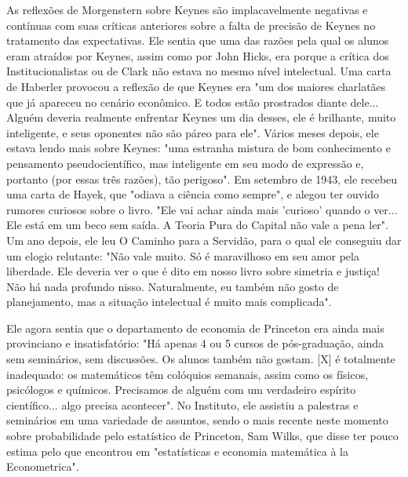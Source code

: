 \documentclass[12pt]{article}
\begin{document}
As reflexões de Morgenstern sobre Keynes são implacavelmente negativas e contínuas com suas críticas anteriores sobre a falta de precisão de Keynes no tratamento das expectativas. Ele sentia que uma das razões pela qual os alunos eram atraídos por Keynes, assim como por John Hicks, era porque a crítica dos Institucionalistas ou de Clark não estava no mesmo nível intelectual. Uma carta de Haberler provocou a reflexão de que Keynes era "um dos maiores charlatães que já apareceu no cenário econômico. E todos estão prostrados diante dele... Alguém deveria realmente enfrentar Keynes um dia desses, ele é brilhante, muito inteligente, e seus oponentes não são páreo para ele". Vários meses depois, ele estava lendo mais sobre Keynes: "uma estranha mistura de bom conhecimento e pensamento pseudocientífico, mas inteligente em seu modo de expressão e, portanto (por essas três razões), tão perigoso". Em setembro de 1943, ele recebeu uma carta de Hayek, que "odiava a ciência como sempre", e alegou ter ouvido rumores curiosos sobre o livro. "Ele vai achar ainda mais 'curioso' quando o ver... Ele está em um beco sem saída. A Teoria Pura do Capital não vale a pena ler". Um ano depois, ele leu O Caminho para a Servidão, para o qual ele conseguiu dar um elogio relutante: "Não vale muito. Só é maravilhoso em seu amor pela liberdade. Ele deveria ver o que é dito em nosso livro sobre simetria e justiça! Não há nada profundo nisso. Naturalmente, eu também não gosto de planejamento, mas a situação intelectual é muito mais complicada".

Ele agora sentia que o departamento de economia de Princeton era ainda mais provinciano e insatisfatório: "Há apenas 4 ou 5 cursos de pós-graduação, ainda sem seminários, sem discussões. Os alunos também não gostam. [X] é totalmente inadequado: os matemáticos têm colóquios semanais, assim como os físicos, psicólogos e químicos. Precisamos de alguém com um verdadeiro espírito científico... algo precisa acontecer". No Instituto, ele assistiu a palestras e seminários em uma variedade de assuntos, sendo o mais recente neste momento sobre probabilidade pelo estatístico de Princeton, Sam Wilks, que disse ter pouco estima pelo que encontrou em "estatísticas e economia matemática à la Econometrica".
\end{document}
